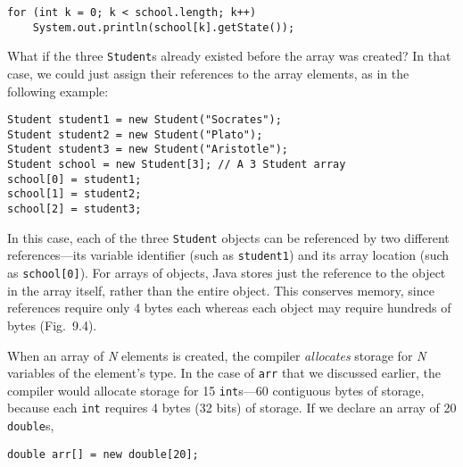 \begin{jjjlisting}
\begin{lstlisting}
for (int k = 0; k < school.length; k++)
    System.out.println(school[k].getState());
\end{lstlisting}
\end{jjjlisting}

What if the three {\tt Student}s already existed before the array was
created? In that case, we could just assign their references to the
array elements, as in the following example:

\begin{jjjlisting}
\begin{lstlisting}
Student student1 = new Student("Socrates"); 
Student student2 = new Student("Plato");
Student student3 = new Student("Aristotle");
Student school = new Student[3]; // A 3 Student array
school[0] = student1;
school[1] = student2;
school[2] = student3;
\end{lstlisting}
\end{jjjlisting}

\noindent In this case, each of the three {\tt Student} objects
can be referenced by two different references---its variable
identifier (such as {\tt student1}) and its array location (such as
{\tt school[0]}).  For arrays of objects, Java stores just the reference to
the object in the array itself, rather than the entire object.  This
conserves memory, since references require only 4 bytes each whereas
each object may require hundreds of bytes (Fig.~9.4).

When an array of {\it N} elements is
created, the compiler {\it allocates} storage for {\it N} variables of
the element's type.  In the case of {\tt arr} that we discussed
earlier, the compiler would allocate storage for 15 {\tt int}s---60
contiguous bytes of storage, because each {\tt int} requires 4 bytes
(32 bits) of storage.  If we declare an array of 20 {\tt double}s,

\begin{jjjlisting}
\begin{lstlisting}
double arr[] = new double[20];
\end{lstlisting}
\end{jjjlisting}


